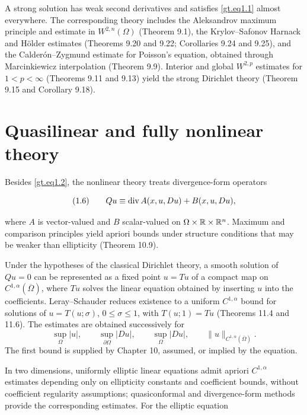 A strong solution has weak second derivatives and satisfies
\eqref{gt.eq1.1} almost everywhere. The corresponding theory includes the
Aleksandrov maximum principle and estimate in $W^{2,n}(\Omega)$ (Theorem 9.1),
the Krylov--Safonov Harnack and H\"older estimates (Theorems 9.20 and 9.22;
Corollaries 9.24 and 9.25), and the Calder\'on--Zygmund estimate for Poisson's
equation, obtained through Marcinkiewicz interpolation (Theorem 9.9). Interior
and global $W^{2,p}$ estimates for
$1<p<\infty$ (Theorems 9.11 and 9.13) yield the strong Dirichlet theory
(Theorem 9.15 and Corollary 9.18).

\section*{Quasilinear and fully nonlinear theory}

Besides \eqref{gt.eq1.2}, the nonlinear theory treats divergence-form operators

\begin{equation}\label{gt.eq1.9}\dcref{(1.6)}\group{chapter-1}\source{gilbarg-trudinger:page-0018}
(1.6)\qquad Qu \equiv \diver A(x, u, Du) + B(x, u, Du),
\end{equation}

where $A$ is vector-valued and $B$ scalar-valued on
$\Omega\times\R\times\R^n$. Maximum and comparison principles yield apriori
bounds under structure conditions that may be weaker than ellipticity
(Theorem 10.9).

Under the hypotheses of the classical Dirichlet theory, a smooth solution of
$Qu=0$ can be represented as a fixed point $u=Tu$ of a compact map on
$C^{1,\alpha}(\overline\Omega)$, where $Tu$ solves the linear equation obtained by
inserting $u$ into the coefficients. Leray--Schauder reduces existence to a uniform
$C^{1,\alpha}$ bound for solutions of
$u=T(u;\sigma)$, $0\leq\sigma\leq1$, with $T(u;1)=Tu$ (Theorems 11.4 and
11.6). The estimates are obtained successively for
\[
\sup_{\Omega}|u|,\qquad
\sup_{\partial\Omega}|Du|,\qquad
\sup_{\Omega}|Du|,\qquad
\|u\|_{C^{1,\alpha}(\overline\Omega)}.
\]
The first bound is supplied by Chapter 10, assumed, or implied by the equation.

In two dimensions, uniformly elliptic linear equations admit apriori
$C^{1,\alpha}$ estimates depending only on ellipticity constants and coefficient
bounds, without coefficient regularity assumptions; quasiconformal and
divergence-form methods provide the corresponding estimates. For the elliptic
equation

